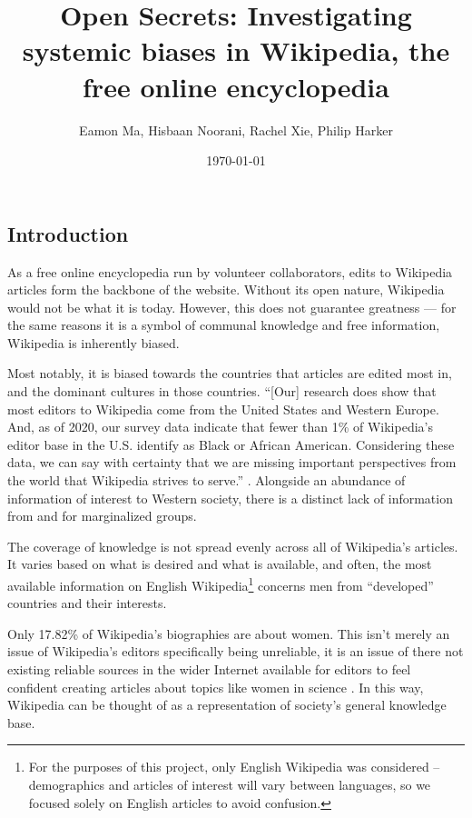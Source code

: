 \documentclass[fontsize=12pt]{article}
\title{Open Secrets: Investigating systemic biases in Wikipedia, the free online encyclopedia}
\author{Eamon Ma, Hisbaan Noorani, Rachel Xie, Philip Harker}
\date{\today}
\begin{document}
\maketitle
\begin{multicols}{2}
    \section{Introduction}

    As a free online encyclopedia run by volunteer collaborators, edits to Wikipedia articles form the backbone of the website.
    Without its open nature, Wikipedia would not be what it is today.
    However, this does not guarantee greatness --- for the same reasons it is a symbol of communal knowledge and free information, Wikipedia is inherently biased.

    Most notably, it is biased towards the countries that articles are edited most in, and the dominant cultures in those countries.
    ``[Our] research does show that most editors to Wikipedia come from the United States and Western Europe. And, as of 2020, our survey data indicate that fewer than 1\% of Wikipedia’s editor base in the U.S. identify as Black or African American. Considering these data, we can say with certainty that we are missing important perspectives from the world that Wikipedia strives to serve.'' \parencite{Uzzell}.
    Alongside an abundance of information of interest to Western society, there is a distinct lack of information from and for marginalized groups.

    The coverage of knowledge is not spread evenly across all of Wikipedia's articles.
    It varies based on what is desired and what is available, and often, the most available information on English Wikipedia\footnote{For the purposes of this project, only English Wikipedia was considered -- demographics and articles of interest will vary between languages, so we focused solely on English articles to avoid confusion.} concerns men from ``developed'' countries and their interests.

    Only 17.82\% of Wikipedia's biographies are about women.
    This isn't merely an issue of Wikipedia's editors specifically being unreliable, it is an issue of there not existing reliable sources in the wider Internet available for editors to feel confident creating articles about topics like women in science \parencite{Erhart}.
    In this way, Wikipedia can be thought of as a representation of society's general knowledge base.


\end{multicols}
\end{document}
